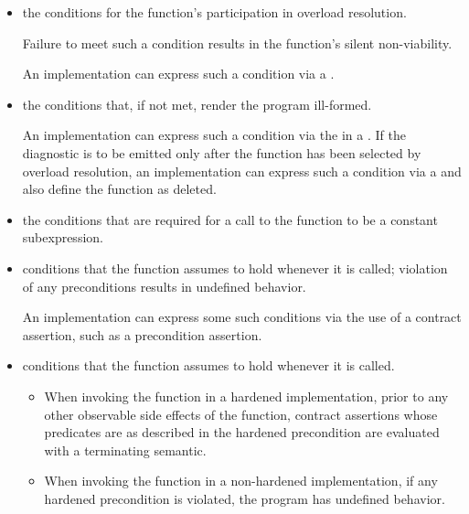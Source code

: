 \begin{itemize}
\item
\constraints
the conditions for the function's participation
in overload resolution.
\begin{note}
Failure to meet such a condition results in the function's silent non-viability.
\end{note}
\begin{example}
An implementation can express such a condition
via a .
\end{example}

\item
\mandates
the conditions that, if not met, render the program ill-formed.
\begin{example}
An implementation can express such a condition
via the 
in a .
If the diagnostic is to be emitted only after the function
has been selected by overload resolution,
an implementation can express such a condition
via a 
and also define the function as deleted.
\end{example}

\item
\constantwhen
the conditions that are required for a call to the function
to be a constant subexpression.

\item
\expects
conditions that the function assumes to hold whenever it is called;
violation of any preconditions results in undefined behavior.
\begin{example}
An implementation can express some such conditions
via the use of a contract assertion,
such as a precondition assertion.
\end{example}

\item
\hardexpects
conditions that the function assumes to hold whenever it is called.
\begin{itemize}
\item
When invoking the function in a hardened implementation,
prior to any other observable side effects of the function,
contract assertions
whose predicates are as described in the hardened precondition
are evaluated with a terminating semantic.
\item
When invoking the function in a non-hardened implementation,
if any hardened precondition is violated,
the program has undefined behavior.
\end{itemize}


\end{itemize}
